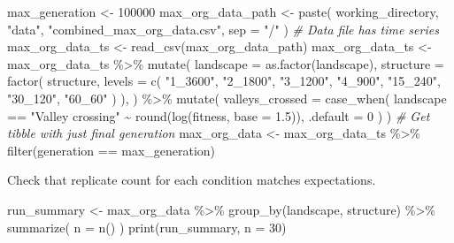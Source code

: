 \documentclass[
]{book}
\newenvironment{Shaded}{\begin{snugshade}}{\end{snugshade}}
\newcommand{\AttributeTok}[1]{\textcolor[rgb]{0.77,0.63,0.00}{#1}}
\newcommand{\CommentTok}[1]{\textcolor[rgb]{0.56,0.35,0.01}{\textit{#1}}}
\newcommand{\DecValTok}[1]{\textcolor[rgb]{0.00,0.00,0.81}{#1}}
\newcommand{\FloatTok}[1]{\textcolor[rgb]{0.00,0.00,0.81}{#1}}
\newcommand{\FunctionTok}[1]{\textcolor[rgb]{0.00,0.00,0.00}{#1}}
\newcommand{\NormalTok}[1]{#1}
\newcommand{\OtherTok}[1]{\textcolor[rgb]{0.56,0.35,0.01}{#1}}
\newcommand{\SpecialCharTok}[1]{\textcolor[rgb]{0.00,0.00,0.00}{#1}}
\newcommand{\StringTok}[1]{\textcolor[rgb]{0.31,0.60,0.02}{#1}}
\begin{document}
\begin{Shaded}
\begin{Highlighting}[]
\NormalTok{max\_generation }\OtherTok{\textless{}{-}} \DecValTok{100000}
\NormalTok{max\_org\_data\_path }\OtherTok{\textless{}{-}} \FunctionTok{paste}\NormalTok{(}
\NormalTok{  working\_directory,}
  \StringTok{"data"}\NormalTok{,}
  \StringTok{"combined\_max\_org\_data.csv"}\NormalTok{,}
  \AttributeTok{sep =} \StringTok{"/"}
\NormalTok{)}
\CommentTok{\# Data file has time series}
\NormalTok{max\_org\_data\_ts }\OtherTok{\textless{}{-}} \FunctionTok{read\_csv}\NormalTok{(max\_org\_data\_path)}
\NormalTok{max\_org\_data\_ts }\OtherTok{\textless{}{-}}\NormalTok{ max\_org\_data\_ts }\SpecialCharTok{\%\textgreater{}\%}
  \FunctionTok{mutate}\NormalTok{(}
    \AttributeTok{landscape =} \FunctionTok{as.factor}\NormalTok{(landscape),}
    \AttributeTok{structure =} \FunctionTok{factor}\NormalTok{(}
\NormalTok{      structure,}
      \AttributeTok{levels =} \FunctionTok{c}\NormalTok{(}
        \StringTok{"1\_3600"}\NormalTok{,}
        \StringTok{"2\_1800"}\NormalTok{,}
        \StringTok{"3\_1200"}\NormalTok{,}
        \StringTok{"4\_900"}\NormalTok{,}
        \StringTok{"15\_240"}\NormalTok{,}
        \StringTok{"30\_120"}\NormalTok{,}
        \StringTok{"60\_60"}
\NormalTok{      )}
\NormalTok{    ),}
\NormalTok{  ) }\SpecialCharTok{\%\textgreater{}\%}
  \FunctionTok{mutate}\NormalTok{(}
    \AttributeTok{valleys\_crossed =} \FunctionTok{case\_when}\NormalTok{(}
\NormalTok{      landscape }\SpecialCharTok{==} \StringTok{"Valley crossing"} \SpecialCharTok{\textasciitilde{}} \FunctionTok{round}\NormalTok{(}\FunctionTok{log}\NormalTok{(fitness, }\AttributeTok{base =} \FloatTok{1.5}\NormalTok{)),}
      \AttributeTok{.default =} \DecValTok{0}
\NormalTok{    )}
\NormalTok{  )}
\CommentTok{\# Get tibble with just final generation}
\NormalTok{max\_org\_data }\OtherTok{\textless{}{-}}\NormalTok{ max\_org\_data\_ts }\SpecialCharTok{\%\textgreater{}\%}
  \FunctionTok{filter}\NormalTok{(generation }\SpecialCharTok{==}\NormalTok{ max\_generation)}
\end{Highlighting}
\end{Shaded}

Check that replicate count for each condition matches expectations.

\begin{Shaded}
\begin{Highlighting}[]
\NormalTok{run\_summary }\OtherTok{\textless{}{-}}\NormalTok{ max\_org\_data }\SpecialCharTok{\%\textgreater{}\%}
  \FunctionTok{group\_by}\NormalTok{(landscape, structure) }\SpecialCharTok{\%\textgreater{}\%}
  \FunctionTok{summarize}\NormalTok{(}
    \AttributeTok{n =} \FunctionTok{n}\NormalTok{()}
\NormalTok{  )}
\FunctionTok{print}\NormalTok{(run\_summary, }\AttributeTok{n =} \DecValTok{30}\NormalTok{)}
\end{Highlighting}
\end{Shaded}
\end{document}
